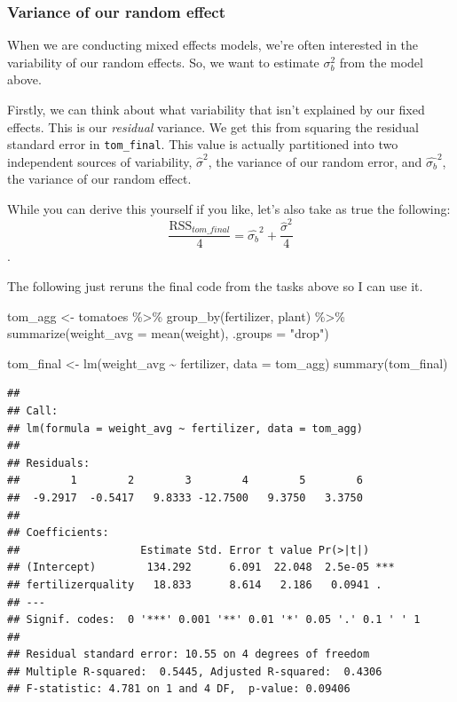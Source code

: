 \documentclass[
  openany]{book}
\newenvironment{Shaded}{\begin{snugshade}}{\end{snugshade}}
\newcommand{\AttributeTok}[1]{\textcolor[rgb]{0.77,0.63,0.00}{#1}}
\newcommand{\FunctionTok}[1]{\textcolor[rgb]{0.00,0.00,0.00}{#1}}
\newcommand{\NormalTok}[1]{#1}
\newcommand{\OtherTok}[1]{\textcolor[rgb]{0.56,0.35,0.01}{#1}}
\newcommand{\SpecialCharTok}[1]{\textcolor[rgb]{0.00,0.00,0.00}{#1}}
\newcommand{\StringTok}[1]{\textcolor[rgb]{0.31,0.60,0.02}{#1}}
\begin{document}
\hypertarget{variance-of-our-random-effect}{%
\subsubsection{Variance of our random effect}\label{variance-of-our-random-effect}}

When we are conducting mixed effects models, we're often interested in the variability of our random effects. So, we want to estimate \(\sigma_b^2\) from the model above.

Firstly, we can think about what variability that isn't explained by our fixed effects. This is our \emph{residual} variance. We get this from squaring the residual standard error in \texttt{tom\_final}. This value is actually partitioned into two independent sources of variability, \(\hat{\sigma}^2\), the variance of our random error, and \(\hat{\sigma_b}^2\), the variance of our random effect.

While you can derive this yourself if you like, let's also take as true the following:
\[\frac{\text{RSS}_{tom\_final}}{4} = \hat{\sigma_b}^2 + \frac{\hat{\sigma}^2}{4} \].

The following just reruns the final code from the tasks above so I can use it.

\begin{Shaded}
\begin{Highlighting}[]
\NormalTok{tom\_agg }\OtherTok{\textless{}{-}}\NormalTok{ tomatoes }\SpecialCharTok{\%\textgreater{}\%} 
  \FunctionTok{group\_by}\NormalTok{(fertilizer, plant) }\SpecialCharTok{\%\textgreater{}\%} 
  \FunctionTok{summarize}\NormalTok{(}\AttributeTok{weight\_avg =} \FunctionTok{mean}\NormalTok{(weight), }\AttributeTok{.groups =} \StringTok{"drop"}\NormalTok{)}

\NormalTok{tom\_final }\OtherTok{\textless{}{-}} \FunctionTok{lm}\NormalTok{(weight\_avg }\SpecialCharTok{\textasciitilde{}}\NormalTok{ fertilizer, }\AttributeTok{data =}\NormalTok{ tom\_agg)}
\FunctionTok{summary}\NormalTok{(tom\_final)}
\end{Highlighting}
\end{Shaded}

\begin{verbatim}
## 
## Call:
## lm(formula = weight_avg ~ fertilizer, data = tom_agg)
## 
## Residuals:
##        1        2        3        4        5        6 
##  -9.2917  -0.5417   9.8333 -12.7500   9.3750   3.3750 
## 
## Coefficients:
##                   Estimate Std. Error t value Pr(>|t|)    
## (Intercept)        134.292      6.091  22.048  2.5e-05 ***
## fertilizerquality   18.833      8.614   2.186   0.0941 .  
## ---
## Signif. codes:  0 '***' 0.001 '**' 0.01 '*' 0.05 '.' 0.1 ' ' 1
## 
## Residual standard error: 10.55 on 4 degrees of freedom
## Multiple R-squared:  0.5445, Adjusted R-squared:  0.4306 
## F-statistic: 4.781 on 1 and 4 DF,  p-value: 0.09406
\end{verbatim}
\end{document}
